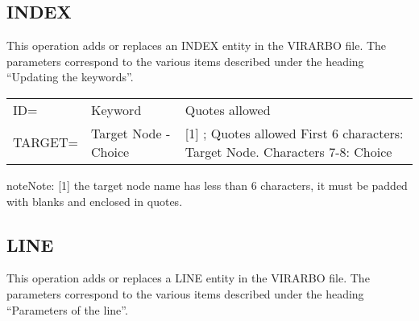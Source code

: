 \documentclass[letterpaper,10pt,english]{sphinxmanual}
\begin{document}
\subsection{INDEX}
\label{\detokenize{Installation_Guide:index-30}}\label{\detokenize{Installation_Guide:index}}
This operation adds or replaces an INDEX entity in the VIRARBO file. The parameters correspond to the various items described under the heading “Updating the keywords”.


\begin{savenotes}\sphinxattablestart
\centering
\begin{tabulary}{\linewidth}[t]{|T|T|T|}
\hline
{}\relax &\relax &\relax \\
\hline
ID=
&
Keyword
&
Quotes allowed
\\
\hline
TARGET=
&
Target Node -
Choice
&
{[}1{]} ; Quotes allowed
First 6 characters: Target Node.
Characters 7-8: Choice
\\
\hline
\end{tabulary}
\par
\sphinxattableend\end{savenotes}

\begin{sphinxadmonition}{note}{Note:}
{[}1{]} the target node name has less than 6 characters, it must be padded with blanks and enclosed in quotes.
\end{sphinxadmonition}


\subsection{LINE}
\label{\detokenize{Installation_Guide:index-31}}\label{\detokenize{Installation_Guide:line}}
This operation adds or replaces a LINE entity in the VIRARBO file. The parameters correspond to the various items described under the heading “Parameters of the line”.
\end{document}

